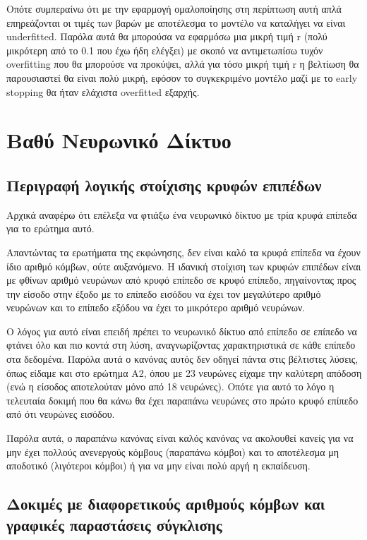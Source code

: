 \documentclass[12pt,a4paper]{article}
\begin{document}
Οπότε συμπεραίνω ότι με την εφαρμογή ομαλοποίησης στη περίπτωση αυτή απλά επηρεάζονται οι τιμές των βαρών με αποτέλεσμα το μοντέλο να καταλήγει να είναι underfitted. Παρόλα αυτά θα μπορούσα να εφαρμόσω μια μικρή τιμή r (πολύ μικρότερη από το 0.1 που έχω ήδη ελέγξει) με σκοπό να αντιμετωπίσω τυχόν overfitting που θα μπορούσε να προκύψει, αλλά για τόσο μικρή τιμή r η βελτίωση θα παρουσιαστεί θα είναι πολύ μικρή, εφόσον το συγκεκριμένο μοντέλο μαζί με το early stopping θα ήταν ελάχιστα overfitted εξαρχής.

\section{Βαθύ Νευρωνικό Δίκτυο}

\subsection{Περιγραφή λογικής στοίχισης κρυφών επιπέδων}

Αρχικά αναφέρω ότι επέλεξα να φτιάξω ένα νευρωνικό δίκτυο με τρία κρυφά επίπεδα για το ερώτημα αυτό. 

Απαντώντας τα ερωτήματα της εκφώνησης, δεν είναι καλό τα κρυφά επίπεδα να έχουν ίδιο αριθμό κόμβων, ούτε αυξανόμενο. Η ιδανική στοίχιση των κρυφών επιπέδων είναι με φθίνων αριθμό νευρώνων από κρυφό επίπεδο σε κρυφό επίπεδο, πηγαίνοντας προς την είσοδο στην έξοδο με το επίπεδο εισόδου να έχει τον μεγαλύτερο αριθμό νευρώνων και το επίπεδο εξόδου να έχει το μικρότερο αριθμό νευρώνων. 

Ο λόγος για αυτό είναι επειδή πρέπει το νευρωνικό δίκτυο από επίπεδο σε επίπεδο να φτάνει όλο και πιο κοντά στη λύση, αναγνωρίζοντας χαρακτηριστικά σε κάθε επίπεδο στα δεδομένα. Παρόλα αυτά ο κανόνας αυτός δεν οδηγεί πάντα στις βέλτιστες λύσεις, όπως είδαμε και στο ερώτημα Α2, όπου με 23 νευρώνες είχαμε την καλύτερη απόδοση (ενώ η είσοδος αποτελούταν μόνο από 18 νευρώνες). Οπότε για αυτό το λόγο η τελευταία δοκιμή που θα κάνω θα έχει παραπάνω νευρώνες στο πρώτο κρυφό επίπεδο από ότι νευρώνες εισόδου.

Παρόλα αυτά, ο παραπάνω κανόνας είναι καλός κανόνας να ακολουθεί κανείς για να μην έχει πολλούς ανενεργούς κόμβους (παραπάνω κόμβοι) και το αποτέλεσμα μη αποδοτικό (λιγότεροι κόμβοι) ή για να μην είναι πολύ αργή η εκπαίδευση.

\subsection{Δοκιμές με διαφορετικούς αριθμούς κόμβων και γραφικές παραστάσεις σύγκλισης}
\end{document}
